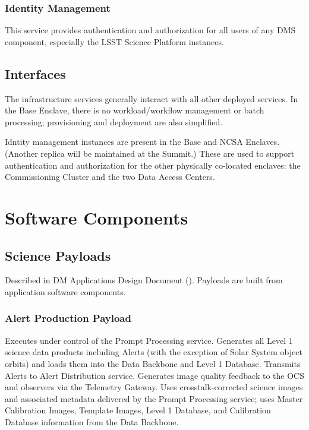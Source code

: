 \documentclass[DM,lsstdraft,toc]{lsstdoc}
\begin{document}
\subsubsection{Identity Management}\label{identity-management}

This service provides authentication and authorization for all users of
any DMS component, especially the LSST Science Platform instances.

\subsection{Interfaces}\label{infrastructure-interfaces}

The infrastructure services generally interact with all other deployed
services.  In the Base Enclave, there is no workload/workflow management or
batch processing; provisioning and deployment are also simplified.

Idntity management instances are present in the Base and NCSA Enclaves.
(Another replica will be maintained at the Summit.)  These are used to support
authentication and authorization for the other physically co-located enclaves:
the Commissioning Cluster and the two Data Access Centers.


\section{Software Components}\label{software-components}

\subsection{Science Payloads}\label{science-payloads}

Described in DM Applications Design Document (). Payloads are
built from application software components.

\subsubsection{Alert Production Payload}\label{alert-production-payload}

Executes under control of the Prompt Processing service. Generates all
Level 1 science data products including Alerts (with the exception of
Solar System object orbits) and loads them into the Data Backbone and
Level 1 Database. Transmits Alerts to Alert Distribution service.
Generates image quality feedback to the OCS and observers via the
Telemetry Gateway. Uses crosstalk-corrected science images and
associated metadata delivered by the Prompt Processing service; uses
Master Calibration Images, Template Images, Level 1 Database, and
Calibration Database information from the Data Backbone.
\end{document}
